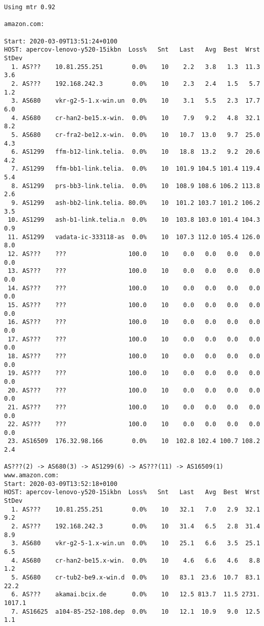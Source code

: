 \documentclass[a4paper]{article}
\begin{document}
\begin{verbatim}
Using mtr 0.92

amazon.com:

Start: 2020-03-09T13:51:24+0100
HOST: apercov-lenovo-y520-15ikbn  Loss%   Snt   Last   Avg  Best  Wrst StDev
  1. AS???    10.81.255.251        0.0%    10    2.2   3.8   1.3  11.3   3.6
  2. AS???    192.168.242.3        0.0%    10    2.3   2.4   1.5   5.7   1.2
  3. AS680    vkr-g2-5-1.x-win.un  0.0%    10    3.1   5.5   2.3  17.7   6.0
  4. AS680    cr-han2-be15.x-win.  0.0%    10    7.9   9.2   4.8  32.1   8.2
  5. AS680    cr-fra2-be12.x-win.  0.0%    10   10.7  13.0   9.7  25.0   4.3
  6. AS1299   ffm-b12-link.telia.  0.0%    10   18.8  13.2   9.2  20.6   4.2
  7. AS1299   ffm-bb1-link.telia.  0.0%    10  101.9 104.5 101.4 119.4   5.4
  8. AS1299   prs-bb3-link.telia.  0.0%    10  108.9 108.6 106.2 113.8   2.6
  9. AS1299   ash-bb2-link.telia. 80.0%    10  101.2 103.7 101.2 106.2   3.5
 10. AS1299   ash-b1-link.telia.n  0.0%    10  103.8 103.0 101.4 104.3   0.9
 11. AS1299   vadata-ic-333118-as  0.0%    10  107.3 112.0 105.4 126.0   8.0
 12. AS???    ???                 100.0    10    0.0   0.0   0.0   0.0   0.0
 13. AS???    ???                 100.0    10    0.0   0.0   0.0   0.0   0.0
 14. AS???    ???                 100.0    10    0.0   0.0   0.0   0.0   0.0
 15. AS???    ???                 100.0    10    0.0   0.0   0.0   0.0   0.0
 16. AS???    ???                 100.0    10    0.0   0.0   0.0   0.0   0.0
 17. AS???    ???                 100.0    10    0.0   0.0   0.0   0.0   0.0
 18. AS???    ???                 100.0    10    0.0   0.0   0.0   0.0   0.0
 19. AS???    ???                 100.0    10    0.0   0.0   0.0   0.0   0.0
 20. AS???    ???                 100.0    10    0.0   0.0   0.0   0.0   0.0
 21. AS???    ???                 100.0    10    0.0   0.0   0.0   0.0   0.0
 22. AS???    ???                 100.0    10    0.0   0.0   0.0   0.0   0.0
 23. AS16509  176.32.98.166        0.0%    10  102.8 102.4 100.7 108.2   2.4

AS???(2) -> AS680(3) -> AS1299(6) -> AS???(11) -> AS16509(1)
www.amazon.com:
Start: 2020-03-09T13:52:18+0100
HOST: apercov-lenovo-y520-15ikbn  Loss%   Snt   Last   Avg  Best  Wrst StDev
  1. AS???    10.81.255.251        0.0%    10   32.1   7.0   2.9  32.1   9.2
  2. AS???    192.168.242.3        0.0%    10   31.4   6.5   2.8  31.4   8.9
  3. AS680    vkr-g2-5-1.x-win.un  0.0%    10   25.1   6.6   3.5  25.1   6.5
  4. AS680    cr-han2-be15.x-win.  0.0%    10    4.6   6.6   4.6   8.8   1.2
  5. AS680    cr-tub2-be9.x-win.d  0.0%    10   83.1  23.6  10.7  83.1  22.2
  6. AS???    akamai.bcix.de       0.0%    10   12.5 813.7  11.5 2731. 1017.1
  7. AS16625  a104-85-252-108.dep  0.0%    10   12.1  10.9   9.0  12.5   1.1


\end{verbatim}
\end{document}
